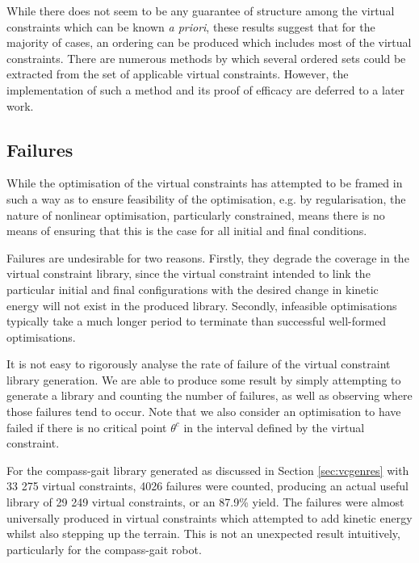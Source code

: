 While there does not seem to be any guarantee of structure among the virtual constraints which can be known \textit{a priori}, these results suggest that for the majority of cases, an ordering can be produced which includes most of the virtual constraints. There are numerous methods by which several ordered sets could be extracted from the set of applicable virtual constraints. However, the implementation of such a method and its proof of efficacy are deferred to a later work.

\subsection{Failures}
While the optimisation of the virtual constraints has attempted to be framed in such a way as to ensure feasibility of the optimisation, e.g. by regularisation, the nature of nonlinear optimisation, particularly constrained, means there is no means of ensuring that this is the case for all initial and final conditions.

Failures are undesirable for two reasons. Firstly, they degrade the coverage in the virtual constraint library, since the virtual constraint intended to link the particular initial and final configurations with the desired change in kinetic energy will not exist in the produced library. Secondly, infeasible optimisations typically take a much longer period to terminate than successful well-formed optimisations.

It is not easy to rigorously analyse the rate of failure of the virtual constraint library generation. We are able to produce some result by simply attempting to generate a library and counting the number of failures, as well as observing where those failures tend to occur. Note that we also consider an optimisation to have failed if there is no critical point $\theta^c$ in the interval defined by the virtual constraint.

For the compass-gait library generated as discussed in Section \ref{sec:vcgenres} with 33 275 virtual constraints, 4026 failures were counted, producing an actual useful library of 29 249 virtual constraints, or an 87.9\% yield. The failures were almost universally produced in virtual constraints which attempted to add kinetic energy whilst also stepping up the terrain. This is not an unexpected result intuitively, particularly for the compass-gait robot.